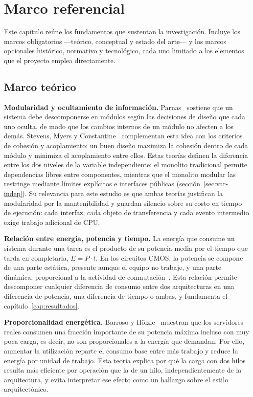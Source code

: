 \chapter{Marco referencial}
\label{cap:marco}

Este capítulo reúne los fundamentos que sustentan la investigación. Incluye los marcos obligatorios ---teórico, conceptual y estado del arte--- y los marcos opcionales histórico, normativo y tecnológico, cada uno limitado a los elementos que el proyecto emplea directamente.

\section{Marco teórico}
\label{sec:marco-teorico}

\textbf{Modularidad y ocultamiento de información.} Parnas~\cite{parnas1972criteria} sostiene que un sistema debe descomponerse en módulos según las decisiones de diseño que cada uno oculta, de modo que los cambios internos de un módulo no afecten a los demás. Stevens, Myers y Constantine~\cite{stevens1974structured} complementan esta idea con los criterios de cohesión y acoplamiento: un buen diseño maximiza la cohesión dentro de cada módulo y minimiza el acoplamiento entre ellos. Estas teorías definen la diferencia entre los dos niveles de la variable independiente: el monolito tradicional permite dependencias libres entre componentes, mientras que el monolito modular las restringe mediante límites explícitos e interfaces públicas (sección~\ref{sec:var-indep}). Su relevancia para este estudio es que ambas teorías justifican la modularidad por la mantenibilidad y guardan silencio sobre su costo en tiempo de ejecución: cada interfaz, cada objeto de transferencia y cada evento intermedio exige trabajo adicional de CPU.

\textbf{Relación entre energía, potencia y tiempo.} La energía que consume un sistema durante una tarea es el producto de su potencia media por el tiempo que tarda en completarla, $E = P \cdot t$. En los circuitos CMOS, la potencia se compone de una parte estática, presente aunque el equipo no trabaje, y una parte dinámica, proporcional a la actividad de conmutación~\cite{barroso2007proportional}. Esta relación permite descomponer cualquier diferencia de consumo entre dos arquitecturas en una diferencia de potencia, una diferencia de tiempo o ambas, y fundamenta el capítulo~\ref{cap:resultados}.

\textbf{Proporcionalidad energética.} Barroso y Hölzle~\cite{barroso2007proportional} muestran que los servidores reales consumen una fracción importante de su potencia máxima incluso con muy poca carga, es decir, no son proporcionales a la energía que demandan. Por ello, aumentar la utilización reparte el consumo base entre más trabajo y reduce la energía por unidad de trabajo. Esta teoría explica por qué la carga con dos hilos resulta más eficiente por operación que la de un hilo, independientemente de la arquitectura, y evita interpretar ese efecto como un hallazgo sobre el estilo arquitectónico.

